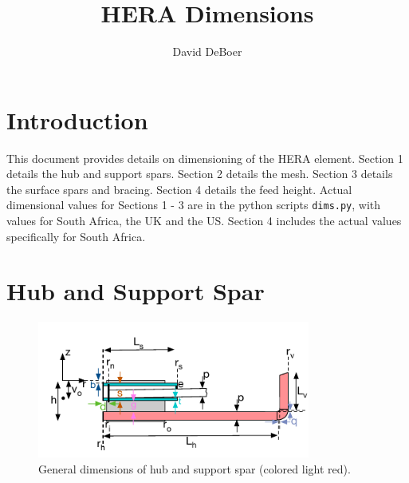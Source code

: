 \documentclass{article}
\begin{document}
\author{David DeBoer}
\title{HERA Dimensions} 
\maketitle

\section{Introduction}
This document provides details on dimensioning of the HERA element.  Section 1 details the hub and support spars.  Section 2 details the mesh.
Section 3 details the surface spars and bracing.  Section 4 details the feed height.  Actual dimensional values for Sections 1 - 3 are in the python scripts {\tt dims.py}, 
with values for South Africa, the UK and the US.  Section 4 includes the actual values specifically for South Africa.

\section{Hub and Support Spar}
\begin{figure}[H]
\includegraphics[width=0.8\textwidth]{hubdims.pdf}
\centering
\vspace{-.15in}
\caption{General dimensions of hub and support spar (colored light red).}
\label{fig:hubdims}
\end{figure}
\end{document}

